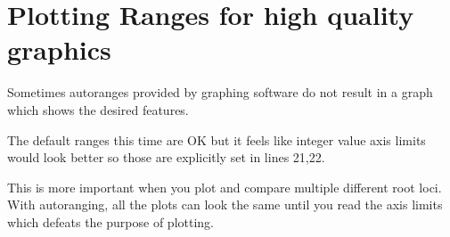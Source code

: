 \section{Plotting Ranges for high quality graphics}
Sometimes autoranges provided by graphing software do not result in a graph which shows the desired features.

The default ranges this time are OK but it feels like integer value axis limits would look better
so those are explicitly set in lines 21,22.

This is more important when you plot and compare multiple different root loci.   With autoranging,
all the plots can look the same until you read the axis limits which defeats the purpose of plotting.



